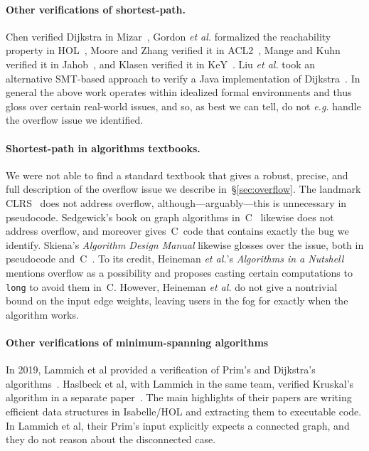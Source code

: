 \paragraph{Other verifications of shortest-path.}
Chen verified Dijkstra in Mizar~\cite{chen2003dijkstra}, Gordon \emph{et al.} formalized the reachability property in HOL~\cite{gordon2003executing}, Moore and Zhang verified it in ACL2~\cite{Moore2005}, Mange and Kuhn verified it in Jahob~\cite{mange2007verifying}, and Klasen verified it in KeY~\cite{klasen2010verifying}.  Liu \emph{et al.} took an alternative SMT-based approach to verify a Java implementation of Dijkstra~\cite{6200101}.  In general the above work operates within
idealized formal environments and thus gloss over certain real-world issues, and so, as best we
can tell, do not \emph{e.g.} handle the overflow issue we identified.



\paragraph{Shortest-path in algorithms textbooks.}
We were not able to find a standard textbook that gives a robust, precise,
and full description of the overflow issue we describe in~\S\ref{sec:overflow}.
The landmark CLRS~\cite{clrs} does not address overflow, although---arguably---this is unnecessary in pseudocode.  Sedgewick's book on graph algorithms in~C~\cite{robert2002algorithms} likewise does not address overflow, and moreover gives~C~code
that contains exactly the bug we identify.  Skiena's \emph{Algorithm Design Manual} likewise
glosses over the issue, both
in pseudocode and~C~\cite{DBLP:books/daglib/0022194}.
To its credit, Heineman \emph{et al.}'s \emph{Algorithms in a Nutshell}~\cite{heineman2008algorithms} mentions overflow as a possibility and
proposes casting certain computations to \texttt{long} to avoid them in~C.  However, Heineman
\emph{et al.} do not give a
nontrivial bound on the input edge weights, leaving users in the fog for exactly when the algorithm works.

\paragraph{Other verifications of minimum-spanning algorithms}In 2019, Lammich et al provided a verification of Prim's and Dijkstra's algorithms~\cite{DBLP:journals/afp/LammichN19}. Haslbeck et al, with Lammich in the same team, verified Kruskal's algorithm in a separate paper~\cite{DBLP:journals/afp/HaslbeckLB19}. The main highlights of their papers are writing efficient data structures in Isabelle/HOL and extracting them to executable code. In Lammich et al, their Prim's input explicitly expects a connected graph, and they do not reason about the disconnected case.

